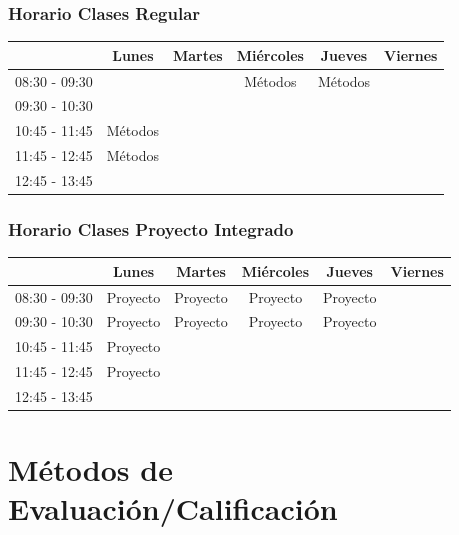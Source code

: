 \documentclass[animated,a4paper,slidestop,xcolor=pst,blue]{beamer}
\begin{document}
\begin{frame}[c]
	\frametitle{Horario Clases Regular}
	\begin{small}
	\begin{center}
	\begin{tabular}{||l|c|c|c|c|c||}
	\hline \hline
				   & Lunes   & Martes  & Miércoles & Jueves  & Viernes \\ \hline \hline
    08:30 - 09:30  &         &         &  Métodos  & Métodos &         \\ \hline
    09:30 - 10:30  &         &         &           &         &         \\ \hline
    10:45 - 11:45  & Métodos &         &           &         &         \\ \hline
	11:45 - 12:45  & Métodos &         &           &         &         \\ \hline
	12:45 - 13:45  &         &         &           &         &         \\ \hline \hline
	\end{tabular}
	\end{center}
	\end{small}
\end{frame}

\begin{frame}[c]
	\frametitle{Horario Clases Proyecto Integrado}
	\begin{small}
	\begin{center}
	\begin{tabular}{||l|c|c|c|c|c||}
	\hline \hline
				   & Lunes     & Martes   & Miércoles & Jueves   & Viernes \\ \hline \hline
    08:30 - 09:30  & Proyecto  & Proyecto & Proyecto  & Proyecto &         \\ \hline
    09:30 - 10:30  & Proyecto  & Proyecto & Proyecto  & Proyecto &         \\ \hline
    10:45 - 11:45  & Proyecto  &          &           &          &         \\ \hline
	11:45 - 12:45  & Proyecto  &          &           &          &         \\ \hline
	12:45 - 13:45  &           &          &           &          &         \\ \hline \hline
	\end{tabular}
	\end{center}
	\end{small}
\end{frame}

\section{Métodos de Evaluación/Calificación}
\end{document}
